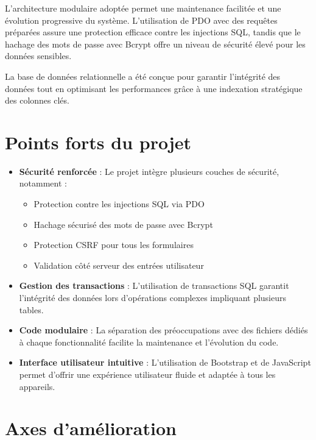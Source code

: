 \documentclass[12pt,a4paper]{report}
\begin{document}
L'architecture modulaire adoptée permet une maintenance facilitée et une évolution progressive du système. L'utilisation de PDO avec des requêtes préparées assure une protection efficace contre les injections SQL, tandis que le hachage des mots de passe avec Bcrypt offre un niveau de sécurité élevé pour les données sensibles.

La base de données relationnelle a été conçue pour garantir l'intégrité des données tout en optimisant les performances grâce à une indexation stratégique des colonnes clés.

\section{Points forts du projet}

\begin{itemize}
    \item \textbf{Sécurité renforcée} : Le projet intègre plusieurs couches de sécurité, notamment :
    \begin{itemize}
        \item Protection contre les injections SQL via PDO
        \item Hachage sécurisé des mots de passe avec Bcrypt
        \item Protection CSRF pour tous les formulaires
        \item Validation côté serveur des entrées utilisateur
    \end{itemize}
    
    \item \textbf{Gestion des transactions} : L'utilisation de transactions SQL garantit l'intégrité des données lors d'opérations complexes impliquant plusieurs tables.
    
    \item \textbf{Code modulaire} : La séparation des préoccupations avec des fichiers dédiés à chaque fonctionnalité facilite la maintenance et l'évolution du code.
    
    \item \textbf{Interface utilisateur intuitive} : L'utilisation de Bootstrap et de JavaScript permet d'offrir une expérience utilisateur fluide et adaptée à tous les appareils.
\end{itemize}

\section{Axes d'amélioration}
\end{document}
